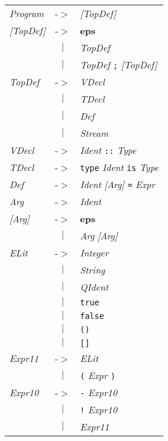 \documentclass{article}
\begin{document}
\begin{center}\begin{tabular}{lll}
\textit{Program} & -$>$ & \textit{[TopDef]} \\
\textit{[TopDef]} & -$>$ & \textbf{eps} \\
 & \multicolumn{1}{c}{\textbf{$|$}} & \textit{TopDef} \\
 & \multicolumn{1}{c}{\textbf{$|$}} & \textit{TopDef} \texttt{;} \textit{[TopDef]} \\
\textit{TopDef} & -$>$ & \textit{VDecl} \\
 & \multicolumn{1}{c}{\textbf{$|$}} & \textit{TDecl} \\
 & \multicolumn{1}{c}{\textbf{$|$}} & \textit{Def} \\
 & \multicolumn{1}{c}{\textbf{$|$}} & \textit{Stream} \\
\textit{VDecl} & -$>$ & \textit{Ident} \texttt{::} \textit{Type} \\
\textit{TDecl} & -$>$ & \texttt{type} \textit{Ident} \texttt{is} \textit{Type} \\
\textit{Def} & -$>$ & \textit{Ident} \textit{[Arg]} \texttt{=} \textit{Expr} \\
\textit{Arg} & -$>$ & \textit{Ident} \\
\textit{[Arg]} & -$>$ & \textbf{eps} \\
 & \multicolumn{1}{c}{\textbf{$|$}} & \textit{Arg} \textit{[Arg]} \\
\textit{ELit} & -$>$ & \textit{Integer} \\
 & \multicolumn{1}{c}{\textbf{$|$}} & \textit{String} \\
 & \multicolumn{1}{c}{\textbf{$|$}} & \textit{QIdent} \\
 & \multicolumn{1}{c}{\textbf{$|$}} & \texttt{true} \\
 & \multicolumn{1}{c}{\textbf{$|$}} & \texttt{false} \\
 & \multicolumn{1}{c}{\textbf{$|$}} & \texttt{()} \\
 & \multicolumn{1}{c}{\textbf{$|$}} & \texttt{[]} \\
\textit{Expr11} & -$>$ & \textit{ELit} \\
 & \multicolumn{1}{c}{\textbf{$|$}} & \texttt{(} \textit{Expr} \texttt{)} \\
\textit{Expr10} & -$>$ & \texttt{-} \textit{Expr10} \\
 & \multicolumn{1}{c}{\textbf{$|$}} & \texttt{!} \textit{Expr10} \\
 & \multicolumn{1}{c}{\textbf{$|$}} & \textit{Expr11} \\

\end{tabular}
\end{center}
\end{document}
